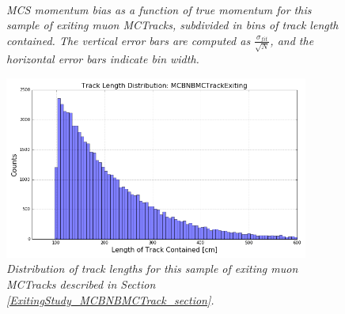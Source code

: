 \begin{figure}
\centering
\mbox{
	\quad
	}
\caption{\textit{MCS momentum bias as a function of true momentum for this sample of exiting muon {\sc MCTracks}, subdivided in bins of track length contained. The vertical error bars are computed as $\frac{\sigma_{fit}}{\sqrt{N}}$, and the horizontal error bars indicate bin width.}}
\end{figure}



\begin{figure}[ht!]
\begin{center}
\includegraphics[width=100mm]{Figures/track_length_distribution_MCBNBMCTrackExiting.png}
\end{center}
\caption{\textit{Distribution of track lengths for this sample of exiting muon {\sc MCTracks} described in Section \ref{ExitingStudy_MCBNBMCTrack_section}.}}
\label{exitingMCTrack_tracklength_fig}
\end{figure}





